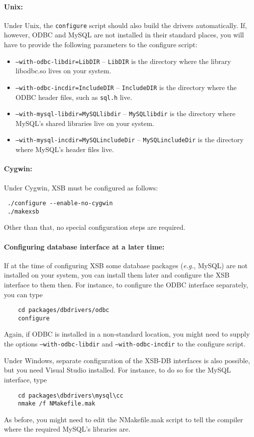 \paragraph{Unix:}
Under Unix, the {\tt configure} script should also build the drivers
automatically.
If, however, ODBC and MySQL are not installed in their standard places, you
will have to provide the following parameters to the configure script:
\begin{itemize}
\item  {\tt --with-odbc-libdir=LibDIR} -- {\tt LibDIR} is the directory
  where the library libodbc.so lives on your system. 
\item  {\tt --with-odbc-incdir=IncludeDIR} -- {\tt IncludeDIR} is the
  directory where the ODBC header files, such as {\tt sql.h} live.
\item {\tt --with-mysql-libdir=MySQLlibdir} -- {\tt MySQLlibdir} is the
  directory where MySQL's shared libraries live on your system.
\item {\tt --with-mysql-incdir=MySQLincludeDir} -- {\tt MySQLincludeDir} is
  the directory where MySQL's header files live.  
\end{itemize}

\paragraph{Cygwin:}
Under Cygwin, XSB must be configured as follows:
\begin{verbatim}
 ./configure --enable-no-cygwin  
 ./makexsb
\end{verbatim}
Other than that, no special configuration steps are required.

\paragraph{Configuring database interface at a later time:}
If at the time of configuring XSB some database packages ({\it e.g.},
MySQL) are not installed on your system, you can install them later and
configure the XSB interface to them then. For instance, to configure the
ODBC interface separately, you can type
\begin{verbatim}
    cd packages/dbdrivers/odbc
    configure
\end{verbatim}
Again, if ODBC is installed in a non-standard location, you might need to
supply the options {\tt --with-odbc-libdir} and {\tt --with-odbc-incdir}
to the configure script.

Under Windows, separate configuration of the XSB-DB interfaces is also
possible, but you need Visual Studio installed. For instance, to do so for
the MySQL interface, type
\begin{verbatim}
    cd packages\dbdrivers\mysql\cc  
    nmake /f NMakefile.mak
\end{verbatim}
As before, you might need to edit the NMakefile.mak script to tell the
compiler where the required MySQL's libraries are.


